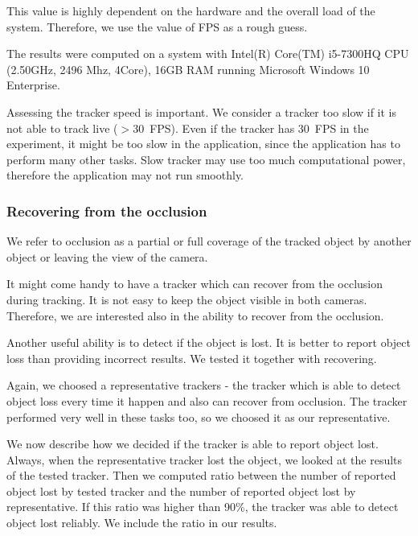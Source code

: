 This value is highly dependent on the hardware and the overall load of the
system.  Therefore, we use the value of FPS as a rough guess.

The results were computed on a system with Intel(R) Core(TM) i5-7300HQ CPU
(2.50GHz, 2496 Mhz, 4Core), 16GB RAM running Microsoft Windows 10 Enterprise.


Assessing the tracker speed is important. We consider a tracker too slow if
it is not able to track live ($>$30~FPS). Even if the tracker has 30~FPS in the
experiment, it might be too slow in the application, since the application has
to perform many other tasks. Slow tracker may use too much computational power,
therefore the application may not run smoothly.

\subsubsection*{Recovering from the occlusion}

We refer to occlusion as a partial or full coverage of the tracked object by
another object or leaving the view of the camera.

It might come handy to have a tracker which can recover from the occlusion
during tracking. It is not easy to keep the object visible in both cameras.
Therefore, we are interested also in the ability to recover from the occlusion.


Another useful ability is to detect if the object is lost. It is better to
report object loss than providing incorrect results. We tested it together with
recovering.

Again, we choosed a representative trackers - the tracker which is able to
detect object loss every time it happen and also can recover from occlusion.
The \simback tracker performed very well in these tasks too, so we choosed it
as our representative.

We now describe how we decided if the tracker is able to report object lost.
Always, when the representative tracker lost the object, we looked at the
results of the tested tracker. Then we computed ratio between the number of
reported object lost by tested tracker and the number of reported object lost
by representative. If this ratio was higher than 90\%, the tracker was able to
detect object lost reliably. We include the ratio in our results.

